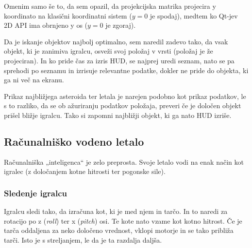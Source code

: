 \documentclass[a4paper]{article}
\begin{document}
Omenim samo še to, da sem opazil, da projekcijska matrika projecira y koordinato na klasični koordinatni sistem ($y = 0$ je spodaj), medtem ko Qt-jev 2D API ima obrnjeno y os ($y = 0$ je zgoraj).

Da je iskanje objektov najbolj optimalno, sem naredil zadevo tako, da vsak objekt, ki je zanimiva igralcu, osveži svoj položaj v vrsti (položaj je že projeciran). In ko pride čas za izris HUD, se najprej uredi seznam, nato se pa sprehodi po seznamu in izrisuje relevantne podatke, dokler ne pride do objekta, ki ga ni več na ekranu.

Prikaz najbližjega asteroida ter letala je narejen podobno kot prikaz podatkov, le s to razliko, da se ob ažuriranju podatkov položaja, preveri če je določen objekt prišel bližje igralcu. Tako si zapomni najbližji objekt, ki ga nato HUD izriše.

\subsection{Računalniško vodeno letalo}
Računalniška „inteligenca“ je zelo preprosta. Svoje letalo vodi na enak način kot igralec (z določanjem kotne hitrosti ter pogonske sile).

\subsubsection{Sledenje igralcu}
Igralcu sledi tako, da izračuna kot, ki je med njem in tarčo. In to naredi za rotacijo po z (\emph{roll}) ter x (\emph{pitch}) osi. Te kote nato vzame kot kotno hitrost. Če je tarča oddaljena za neko določeno vrednost, vklopi motorje in se tako približa tarči. Isto je s streljanjem, le da je ta razdalja daljša.
\end{document}
